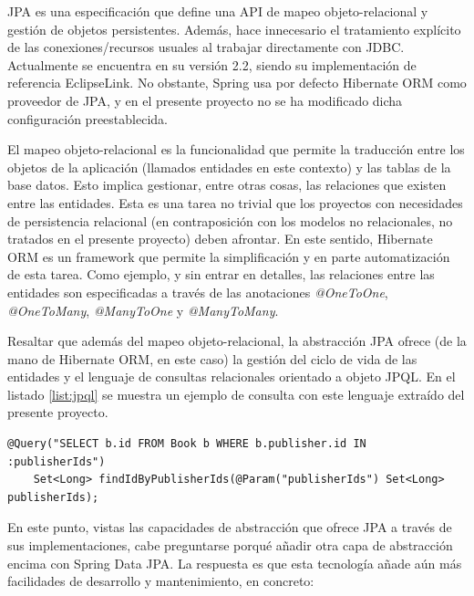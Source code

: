 \documentclass[a4paper,12pt,twoside,openright]{report}
\begin{document}
    JPA es una especificación que define una API de mapeo objeto-relacional y gestión de objetos persistentes. Además, hace innecesario el tratamiento explícito de las conexiones/recursos usuales al trabajar directamente con JDBC. Actualmente se encuentra en su versión 2.2, siendo su implementación de referencia EclipseLink. No obstante, Spring usa por defecto Hibernate ORM como proveedor de JPA, y en el presente proyecto no se ha modificado dicha configuración preestablecida.
    
    El mapeo objeto-relacional es la funcionalidad que permite la traducción entre los objetos de la aplicación (llamados entidades en este contexto) y las tablas de la base datos. Esto implica gestionar, entre otras cosas, las relaciones que existen entre las entidades. Esta es una tarea no trivial que los proyectos con necesidades de persistencia relacional (en contraposición con los modelos no relacionales, no tratados en el presente proyecto) deben afrontar. En este sentido, Hibernate ORM es un framework que permite la simplificación y en parte automatización de esta tarea. Como ejemplo, y sin entrar en detalles, las relaciones entre las entidades son especificadas a través de las anotaciones \emph{@OneToOne}, \emph{@OneToMany}, \emph{@ManyToOne} y \emph{@ManyToMany}.
    
    Resaltar que además del mapeo objeto-relacional, la abstracción JPA ofrece (de la mano de Hibernate ORM, en este caso) la gestión del ciclo de vida de las entidades y el lenguaje de consultas relacionales orientado a objeto JPQL. En el listado \ref{list:jpql} se muestra un ejemplo de consulta con este lenguaje extraído del presente proyecto.
    
    \begin{lstlisting}[caption=Ejemplo de consulta especificada en JPQL,label=list:jpql]
    @Query("SELECT b.id FROM Book b WHERE b.publisher.id IN :publisherIds")
    Set<Long> findIdByPublisherIds(@Param("publisherIds") Set<Long> publisherIds);
    \end{lstlisting}
    
    En este punto, vistas las capacidades de abstracción que ofrece JPA a través de sus implementaciones, cabe preguntarse porqué añadir otra capa de abstracción encima con Spring Data JPA. La respuesta es que esta tecnología añade aún más facilidades de desarrollo y mantenimiento, en concreto:
    
\end{document}
